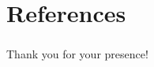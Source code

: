 \documentclass[10pt]{beamer}
\begin{document}
\section*{References}
\begin{frame} 
    \frametitle{\insertsection}
    
    
\end{frame}

\begin{frame}
    \begin{center}
        \Huge Thank you for your presence!
    \end{center}
\end{frame}
\end{document}
